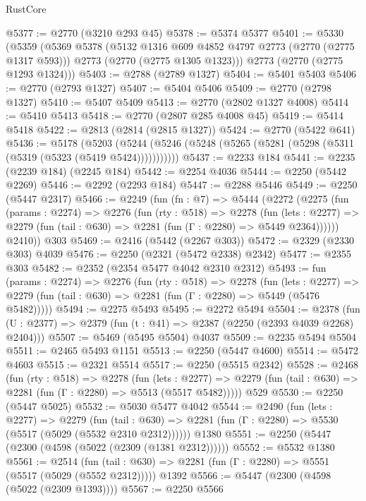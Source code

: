 \begin{lexlean}{RustCore}
\begin{coremodule}
@5377 := @2770 (@3210 @293 @45)
@5378 := @5374 @5377
@5401 := @5330
    (@5359
      (@5369
        @5378
        (@5132 @1316 @609 @4852 @4797 @2773 (@2770 (@2775 @1317 @593)))
        @2773
        (@2770 (@2775 @1305 @1323)))
      @2773
      (@2770 (@2775 @1293 @1324)))
@5403 := @2788 (@2789 @1327)
@5404 := @5401 @5403
@5406 := @2770 (@2793 @1327)
@5407 := @5404 @5406
@5409 := @2770 (@2798 @1327)
@5410 := @5407 @5409
@5413 := @2770 (@2802 @1327 @4008)
@5414 := @5410 @5413
@5418 := @2770 (@2807 @285 @4008 @45)
@5419 := @5414 @5418
@5422 := @2813 (@2814 (@2815 @1327))
@5424 := @2770 (@5422 @641)
@5436 := @5178
    (@5203 (@5244 (@5246 (@5248 (@5265 (@5281 (@5298 (@5311 (@5319 (@5323 (@5419 @5424)))))))))))
@5437 := @2233 @184
@5441 := @2235 (@2239 @184) (@2245 @184)
@5442 := @2254 @4036
@5444 := @2250 (@5442 @2269)
@5446 := @2292 (@2293 @184)
@5447 := @2288 @5446
@5449 := @2250 (@5447 @2317)
@5466 := @2249
    (fun (fn : @7) =>
    @5444
      (@2272
        (@2275
          (fun (params : @2274) =>
          @2276
            (fun (rty : @518) =>
            @2278
              (fun (lets : @2277) =>
              @2279 (fun (tail : @630) => @2281 (fun (Γ : @2280) => @5449 @2364))))))
        @2410))
    @303
@5469 := @2416 (@5442 (@2267 @303))
@5472 := @2329 (@2330 @303) @4039
@5476 := @2250 (@2321 (@5472 @2338) @2342)
@5477 := @2355 @303
@5482 := @2352 (@2354 @5477 @4042 @2310 @2312)
@5493 := fun (params : @2274) =>
  @2276
    (fun (rty : @518) =>
    @2278
      (fun (lets : @2277) =>
      @2279 (fun (tail : @630) => @2281 (fun (Γ : @2280) => @5449 (@5476 @5482)))))
@5494 := @2275 @5493
@5495 := @2272 @5494
@5504 := @2378 (fun (U : @2377) => @2379 (fun (t : @41) => @2387 (@2250 (@2393 @4039 @2268) @2404)))
@5507 := @5469 (@5495 @5504) @4037
@5509 := @2235 @5494 @5504
@5511 := @2465 @5493 @1151
@5513 := @2250 (@5447 @4600)
@5514 := @5472 @4603
@5515 := @2321 @5514
@5517 := @2250 (@5515 @2342)
@5528 := @2468
    (fun (rty : @518) =>
    @2278
      (fun (lets : @2277) =>
      @2279 (fun (tail : @630) => @2281 (fun (Γ : @2280) => @5513 (@5517 @5482)))))
    @529
@5530 := @2250 (@5447 @5025)
@5532 := @5030 @5477 @4042
@5544 := @2490
    (fun (lets : @2277) =>
    @2279
      (fun (tail : @630) => @2281 (fun (Γ : @2280) => @5530 (@5517 (@5029 (@5532 @2310 @2312))))))
    @1380
@5551 := @2250 (@5447 (@2300 (@4598 (@5022 (@2309 (@1381 @2312))))))
@5552 := @5532 @1380
@5561 := @2514
    (fun (tail : @630) => @2281 (fun (Γ : @2280) => @5551 (@5517 (@5029 (@5552 @2312)))))
    @1392
@5566 := @5447 (@2300 (@4598 (@5022 (@2309 @1393))))
@5567 := @2250 @5566

\end{coremodule}
\end{lexlean}

